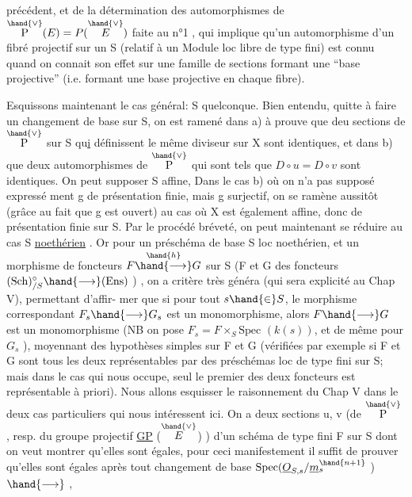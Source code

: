 
précédent, et de la détermination des automorphismes de $\overset{\hand{\vee}}{\mathrm{P}}(E) = P(\overset{\hand{\vee}}{E})$ faite
au n°1 , qui implique qu'un automorphisme d'un fibré projectif sur un S
(relatif à un Module loc libre de type fini)  est connu quand on connait
son effet sur une famille de sections formant une ``base projective''
(i.e. formant une base projective en chaque  fibre).

Esquissons maintenant le cas général: S quelconque.  Bien entendu,
quitte à faire un changement de base sur S, on est ramené dans a) à prouve
que deu sections  de $\overset{\hand{\vee}}{\mathrm{P}}$ sur S  qu\uline{i} définissent le même diviseur sur X sont
identiques, et dans b) que deux automorphismes  de $\overset{\hand{\vee}}{\mathrm{P}}$  qui sont tels que
$D\circ u = D\circ v$  sont identiques. On peut supposer  S affine, Dans le cas b) où on n'a pas supposé expressé%
ment  g de présentation finie, mais g surjectif, on se ramène aussitôt
(grâce au fait que g est ouvert) au cas où X est également affine, donc
de présentation finie sur S.  Par le procédé bréveté, on peut maintenant
se réduire au cas S \uline{noethérien} .  Or pour un préschéma de base S loc noethérien,
et un morphisme de foncteurs  $F \overset{\hand{h}}{\hand{\longrightarrow}} G$ sur S  (F et G des foncteurs
$(\mathrm{Sch})_{/S}^{\circ} \hand{\longrightarrow} (\mathrm{Ens})$ ) ,  on a  critère très généra (qui sera explicité au Chap V), permettant d'affir-%
mer que si  pour tout  $s \hand{\in} S$, le morphisme correspondant $F_s \hand{\longrightarrow} G_s$ est
un monomorphisme, alors $F \hand{\longrightarrow} G$ est un monomorphisme  (NB on pose $F_s{=}F\times_S\mathrm{Spec}$
$(k(s))$, et de même pour $G_s$ ),  moyennant des hypothèses simples sur F et G
(vérifiées par exemple si F et G sont tous les deux représentables par des
préschémas loc de type fini sur S; mais dans le cas qui nous occupe, seul
le premier des deux foncteurs est représentable à priori).  Nous allons
esquisser le raisonnement du Chap V  dans le deux cas particuliers qui nous
intéressent ici.  On a deux sections u, v (de $\overset{\hand{\vee}}{\mathrm{P}}$ , resp. du groupe projectif
\uline{GP} ($\overset{\hand{\vee}}{E}$) ) d'un schéma de type fini F sur S dont on veut montrer qu'elles
sont égales, pour ceci manifestement il suffit de prouver qu'elles sont
égales après tout changement de base  $\mathrm{Spec}(\underline{O}_{S,s}/\underline{m}_s^{\hand{n+1}}$ ) $\hand{\longrightarrow}$ ,

